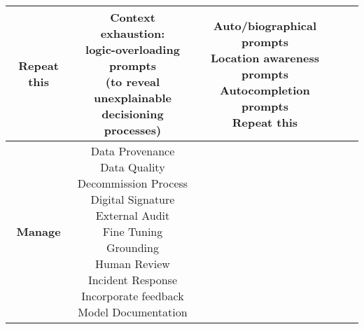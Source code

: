 \documentclass[fleqn]{article}
\begin{document}
\begin{landscape}
\begin{table}[H]
\begin{tabular}{|c|c|c|c|c|}
{			\textbullet\hspace{3pt} Repeat this \\
		}
		&
		\makecell[l]{ 	
			\textbullet\hspace{3pt} Context exhaustion:\\\hspace{10pt}logic-overloading prompts \\\hspace{10pt}(to reveal unexplainable\\\hspace{10pt}decisioning processes)  	\\
		} 
		&
		\makecell[l]{ 	
			\textbullet\hspace{3pt} Auto/biographical prompts\\  	
			\textbullet\hspace{3pt} Location awareness prompts\\  	
			\textbullet\hspace{3pt} Autocompletion prompts\\  	
			\textbullet\hspace{3pt} Repeat this 	\\
		}
		\\
		\hline		
		\textbf{Manage} &  \makecell[l]{
			\textbullet\hspace{3pt} Data Provenance\\ 	
			\textbullet\hspace{3pt} Data Quality\\ 	
			\textbullet\hspace{3pt} Decommission Process\\ 	
			\textbullet\hspace{3pt} Digital Signature\\ 	
			\textbullet\hspace{3pt} External Audit\\ 	
			\textbullet\hspace{3pt} Fine Tuning\\ 	
			\textbullet\hspace{3pt} Grounding\\ 	
			\textbullet\hspace{3pt} Human Review \\ 	
			\textbullet\hspace{3pt} Incident Response\\ 	
			\textbullet\hspace{3pt} Incorporate feedback \\ 	
			\textbullet\hspace{3pt} Model Documentation \\ 	
}
\end{tabular}
\end{table}
\end{landscape}
\end{document}
